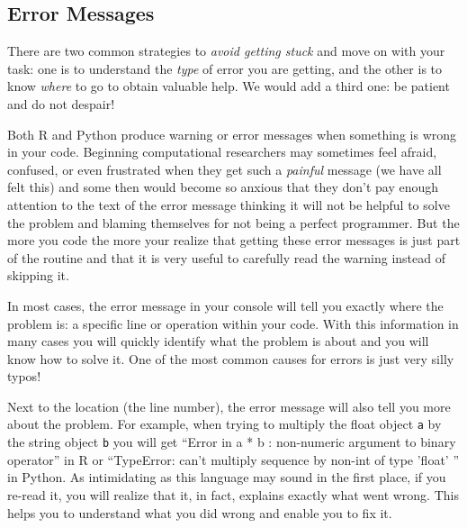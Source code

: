 \subsection{Error Messages}\label{sec:errormessages}


There are two common strategies to \textit{avoid getting stuck} and move on with your task: one is to understand the \textit{type} of error you are getting, and the other is to know \textit{where} to go to obtain valuable help. We would add a third one: be patient and do not despair!

Both R and Python produce warning or error messages when something is wrong in your code. Beginning computational researchers may sometimes feel afraid, confused, or even frustrated when they get such a \textit{painful} message (we have all felt this) and some then would become so anxious that they don't pay enough attention to the text of the error message thinking it will not be helpful to solve the problem and blaming themselves for not being a perfect programmer. But the more you code the more your realize that getting these error messages is just part of the routine and that it is very useful to carefully read the warning instead of skipping it.

In most cases, the error message in your console will tell you exactly where the problem is: a specific line or operation within your code. With this information in many cases you will quickly identify what the problem is about and you will know how to solve it. One of the most common causes for  errors is just very silly typos!

Next to the location (the line number), the error message will also tell you more about the problem. For example, when trying to multiply the float object \texttt{a} by the string object \texttt{b} you will get ``Error in a * b : non-numeric argument to binary operator'' in R or ``TypeError: can't multiply sequence by non-int of type 'float' '' in Python. As intimidating as this language may sound in the first place, if you re-read it, you will realize that it, in fact, explains exactly what went wrong. This helps you to understand what you did wrong and enable you to fix it.



